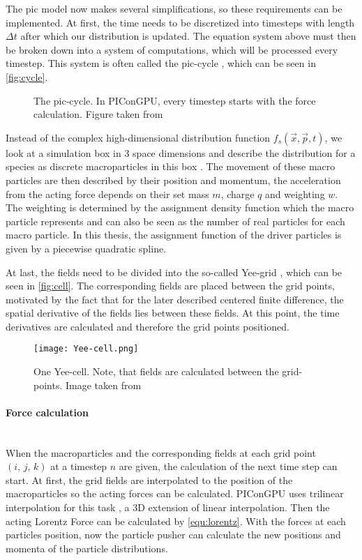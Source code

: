 \documentclass[bachelor_thesis]{subfiles}
\begin{document}
The \gls{pic} model now makes several simplifications, so these requirements can be implemented.
At first, the time needs to be discretized into timesteps with length $\Delta t$ after which our distribution is updated. The equation system above must then be broken down into a system of computations, which will be processed every timestep.
This system is often called the \gls{pic}-cycle \cite{Huebl2019}, which can be seen in \autoref{fig:cycle}.

\begin{figure}
	\centering
	
	\caption{The \gls{pic}-cycle. In PIConGPU, every timestep starts with the force calculation. Figure taken from \cite{Pausch2019}}
	\label{fig:cycle}
\end{figure}

Instead of the complex high-dimensional distribution function $f_s(\vec{x}, \vec{p}, t)$, we look at a simulation box in 3 space dimensions and describe the distribution for a species as discrete macroparticles in this box \cite{Burau2010}.
The movement of these macro particles are then described by their position and momentum, the acceleration from the acting force depends on their set mass $m$, charge $q$ and weighting $w$.
The weighting is determined by the assignment density function which the macro particle represents and can also be seen as the number of real particles for each macro particle.
In this thesis, the assignment function of the driver particles is given by a piecewise quadratic spline.

At last, the fields need to be divided into the so-called Yee-grid \cite{Yee1966}, which can be seen in \autoref{fig:cell}. The corresponding fields are placed between the grid points, motivated by the fact that for the later described centered finite difference, 
the spatial derivative of the fields lies between these fields. At this point, the time derivatives are calculated and therefore the grid points positioned.

\begin{figure}
	\centering
	\texttt{[image: Yee-cell.png]}
	\caption{One Yee-cell. Note, that fields are calculated between the grid-points. Image taken from \cite{PICRepo}}
	\label{fig:cell}
\end{figure}

\paragraph*{Force calculation}\hspace{0pt} \\
When the macroparticles and the corresponding fields at each grid point $(i, \, j, \,k)$ at a timestep $n$ are given, the calculation of the next time step can start.
At first, the grid fields are interpolated to the position of the macroparticles so the acting forces can be calculated. PIConGPU uses trilinear interpolation for this task \cite{Huebl2019, PICRepo}, a 3D extension of linear interpolation.
Then the acting Lorentz Force can be calculated by \autoref{equ:lorentz}. With the forces at each particles position, now the particle pusher can calculate the new positions and momenta of the particle distributions.
\end{document}
